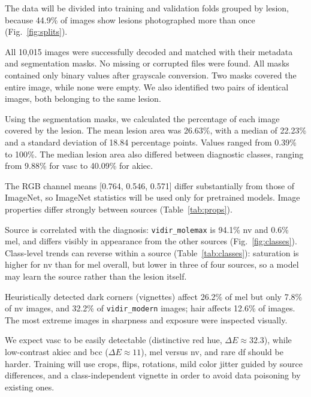 The data will be divided into training and validation folds grouped by lesion, because 44.9\% of images show lesions photographed more than once (Fig.~\ref{fig:splits}).

All 10,015 images were successfully decoded and matched with their metadata and segmentation masks. No missing or corrupted files were found. All masks contained only binary values after grayscale conversion. Two masks covered the entire image, while none were empty. We also identified two pairs of identical images, both belonging to the same lesion.

Using the segmentation masks, we calculated the percentage of each image covered by the lesion. The mean lesion area was 26.63\%, with a median of 22.23\% and a standard deviation of 18.84 percentage points. Values ranged from 0.39\% to 100\%. The median lesion area also differed between diagnostic classes, ranging from 9.88\% for vasc to 40.09\% for akiec.

The RGB channel means [0.764, 0.546, 0.571] differ substantially from those of ImageNet, so ImageNet statistics will be used only for pretrained models.
Image properties differ strongly between sources (Table~\ref{tab:props}).

Source is correlated with the diagnosis: \texttt{vidir\_molemax} is 94.1\% nv and 0.6\% mel, and differs visibly in appearance from the other sources (Fig.~\ref{fig:classes}).
Class-level trends can reverse within a source (Table~\ref{tab:classes}): saturation is higher for nv than for mel overall, but lower in three of four sources, so a model may learn the source rather than the lesion itself.

Heuristically detected dark corners (vignettes) affect 26.2\% of mel but only 7.8\% of nv images, and 32.2\% of \texttt{vidir\_modern} images; hair affects 12.6\% of images.
The most extreme images in sharpness and exposure were inspected visually.

We expect vasc to be easily detectable (distinctive red hue, $\Delta E \approx 32.3$), while low-contrast akiec and bcc ($\Delta E\approx11$), mel versus nv, and rare df should be harder.
Training will use crops, flips, rotations, mild color jitter guided by source differences, and a class-independent vignette in order to avoid data poisoning by existing ones.

